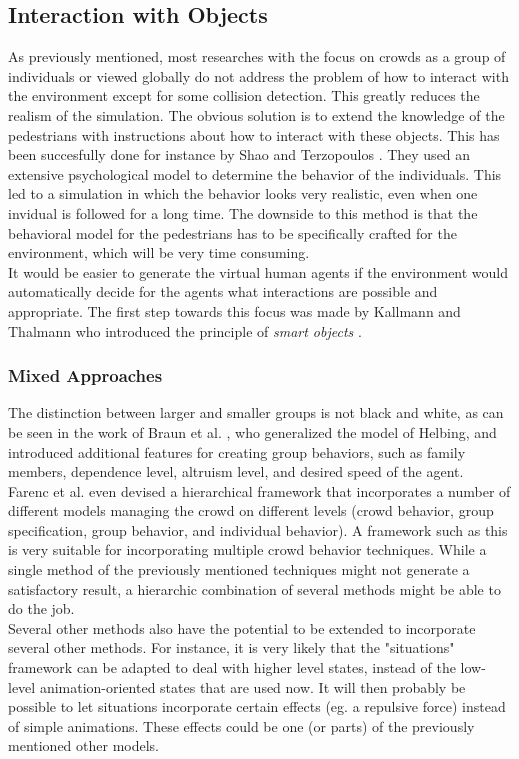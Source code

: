 \documentclass[11pt]{article}
\begin{document}
\subsection{Interaction with Objects}
As previously mentioned, most researches with the focus on crowds as a group of individuals or viewed globally do not address the problem of how to interact with the environment except for some collision detection. This greatly reduces the realism of the simulation. The obvious solution is to extend the knowledge of the pedestrians with instructions about how to interact with these objects. This has been succesfully done for instance by Shao and Terzopoulos \cite{A_autonomouspedestrians}. They used an extensive psychological model to determine the behavior of the individuals. This led to a simulation in which the behavior looks very realistic, even when one invidual is followed for a long time. The downside to this method is that the behavioral model for the pedestrians has to be specifically crafted for the environment, which will be very time consuming. \\
It would be easier to generate the virtual human agents if the environment would automatically decide for the agents what interactions are possible and appropriate. The first step towards this focus was made by Kallmann and Thalmann who introduced the principle of \textit{smart objects} \cite{Kallmann98modelingobjects}.


\subsubsection{Mixed Approaches}
The distinction between larger and smaller groups is not black and white, as can be seen in the work of Braun et al. \cite{10.1109CASA.2003.1199317}, who generalized the model of Helbing, and introduced additional features for creating group behaviors, such as family members, dependence level, altruism level, and desired speed of the agent.\\
Farenc et al. even devised a hierarchical framework that incorporates a number of different models managing the crowd on different levels (crowd behavior, group specification, group behavior, and individual behavior). A framework such as this is very suitable for incorporating multiple crowd behavior techniques. While a single method of the previously mentioned techniques might not generate a satisfactory result, a hierarchic combination of several methods might be able to do the job.\\
Several other methods also have the potential to be extended to incorporate several other methods. For instance, it is very likely that the "situations" framework can be adapted to deal with higher level states, instead of the low-level animation-oriented states that are used now. It will then probably be possible to let situations incorporate certain effects (eg. a repulsive force) instead of simple animations. These effects could be one (or parts) of the previously mentioned other models.
\end{document}
